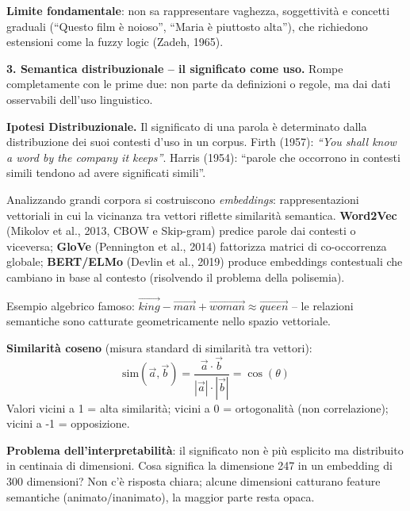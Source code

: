 \documentclass[12pt,a4paper]{article}
\begin{document}
\textbf{Limite fondamentale}: non sa rappresentare vaghezza, soggettivit\`a e concetti graduali (``Questo film \`e noioso'', ``Maria \`e piuttosto alta''), che richiedono estensioni come la fuzzy logic (Zadeh, 1965).

\textbf{3. Semantica distribuzionale -- il significato come uso.} Rompe completamente con le prime due: non parte da definizioni o regole, ma dai dati osservabili dell'uso linguistico.

\begin{defbox}
\textbf{Ipotesi Distribuzionale.}
Il significato di una parola \`e determinato dalla distribuzione dei suoi contesti d'uso in un corpus. Firth (1957): \emph{``You shall know a word by the company it keeps''}. Harris (1954): ``parole che occorrono in contesti simili tendono ad avere significati simili''.
\end{defbox}

Analizzando grandi corpora si costruiscono \emph{embeddings}: rappresentazioni vettoriali in cui la vicinanza tra vettori riflette similarit\`a semantica. \textbf{Word2Vec} (Mikolov et al., 2013, CBOW e Skip-gram) predice parole dai contesti o viceversa; \textbf{GloVe} (Pennington et al., 2014) fattorizza matrici di co-occorrenza globale; \textbf{BERT/ELMo} (Devlin et al., 2019) produce embeddings contestuali che cambiano in base al contesto (risolvendo il problema della polisemia).

\begin{examplebox}
Esempio algebrico famoso: $\vec{king} - \vec{man} + \vec{woman} \approx \vec{queen}$ -- le relazioni semantiche sono catturate geometricamente nello spazio vettoriale.
\end{examplebox}

\begin{formulabox}
\textbf{Similarit\`a coseno} (misura standard di similarit\`a tra vettori):
\[
\text{sim}(\vec{a}, \vec{b}) = \frac{\vec{a}\cdot\vec{b}}{|\vec{a}|\cdot|\vec{b}|} = \cos(\theta)
\]
Valori vicini a 1 = alta similarit\`a; vicini a 0 = ortogonalit\`a (non correlazione); vicini a -1 = opposizione.
\end{formulabox}

\textbf{Problema dell'interpretabilit\`a}: il significato non \`e pi\`u esplicito ma distribuito in centinaia di dimensioni. Cosa significa la dimensione 247 in un embedding di 300 dimensioni? Non c'\`e risposta chiara; alcune dimensioni catturano feature semantiche (animato/inanimato), la maggior parte resta opaca.
\end{document}

